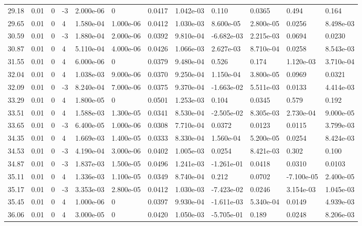 \documentclass[preview]{standalone}
\begin{document}
{{{\begin{tabular}{L{1.2cm}C{1.2cm} C{0.3cm}C{0.5cm} C{1.4cm}C{1.4cm} C{1.4cm}C{1.4cm} C{1.6cm}C{1.6cm} C{1.6cm}C{1.6cm}}
  29.18  &  0.01  & 0     & -3 &  2.000e-06  & 0  &  0.0417&   1.042e-03& 0.110 & 0.0365   &  0.494 & 0.164  \\ 
  29.65  &  0.01  & 0     &  4 &  1.580e-04  & 1.000e-06  &  0.0412&   1.030e-03& 8.600e-05 & 2.800e-05   &  0.0256 & 8.498e-03  \\ 
  30.59  &  0.01  & 0     & -3 &  1.880e-04  & 2.000e-06  &  0.0392&   9.810e-04& -6.682e-03 & 2.215e-03   &  0.0694 & 0.0230  \\ 
  30.87  &  0.01  & 0     &  4 &  5.110e-04  & 4.000e-06  &  0.0426&   1.066e-03& 2.627e-03 & 8.710e-04   &  0.0258 & 8.543e-03  \\ 
  31.55  &  0.01  & 0     &  4 &  6.000e-06  & 0  &  0.0379&   9.480e-04& 0.526 & 0.174   &  1.120e-03 & 3.710e-04  \\ 
  32.04  &  0.01  & 0     &  4 &  1.038e-03  & 9.000e-06  &  0.0370&   9.250e-04& 1.150e-04 & 3.800e-05   &  0.0969 & 0.0321  \\ 
  32.09  &  0.01  & 0     & -3 &  8.240e-04  & 7.000e-06  &  0.0375&   9.370e-04& -1.663e-02 & 5.511e-03   &  0.0133 & 4.414e-03  \\ 
  33.29  &  0.01  & 0     &  4 &  1.800e-05  & 0  &  0.0501&   1.253e-03& 0.104 & 0.0345   &  0.579 & 0.192  \\ 
  33.51  &  0.01  & 0     &  4 &  1.588e-03  & 1.300e-05  &  0.0341&   8.530e-04& -2.505e-02 & 8.305e-03   &  2.730e-04 & 9.000e-05  \\ 
  33.65  &  0.01  & 0     & -3 &  6.400e-05  & 1.000e-06  &  0.0308&   7.710e-04& 0.0372 & 0.0123   &  0.0115 & 3.799e-03  \\ 
  34.35  &  0.01  & 0     &  4 &  1.669e-03  & 1.400e-05  &  0.0333&   8.330e-04& 1.560e-04 & 5.200e-05   &  0.0254 & 8.424e-03  \\ 
  34.53  &  0.01  & 0     & -3 &  4.190e-04  & 3.000e-06  &  0.0402&   1.005e-03& 0.0254 & 8.421e-03   &  0.302 & 0.100  \\ 
  34.87  &  0.01  & 0     & -3 &  1.837e-03  & 1.500e-05  &  0.0496&   1.241e-03& -1.261e-01 & 0.0418   &  0.0310 & 0.0103  \\ 
  35.11  &  0.01  & 0     &  4 &  1.336e-03  & 1.100e-05  &  0.0349&   8.740e-04& 0.212 & 0.0702   &  -7.100e-05 & 2.400e-05  \\ 
  35.17  &  0.01  & 0     & -3 &  3.353e-03  & 2.800e-05  &  0.0412&   1.030e-03& -7.423e-02 & 0.0246   &  3.154e-03 & 1.045e-03  \\ 
  35.45  &  0.01  & 0     &  4 &  1.000e-06  & 0  &  0.0397&   9.930e-04& -1.611e-03 & 5.340e-04   &  0.0149 & 4.939e-03  \\ 
  36.06  &  0.01  & 0     &  4 &  3.000e-05  & 0  &  0.0420&   1.050e-03& -5.705e-01 & 0.189   &  0.0248 & 8.206e-03  \\ 
\hline 
\end{tabular} 

}}}
\end{document}
